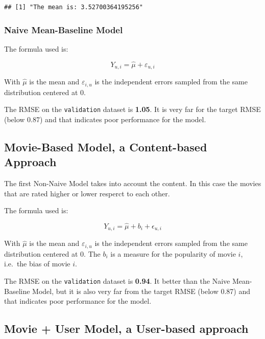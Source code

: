 \documentclass[
]{article}
\begin{document}
\begin{verbatim}
## [1] "The mean is: 3.52700364195256"
\end{verbatim}

\hypertarget{naive-mean-baseline-model}{%
\subsubsection{Naive Mean-Baseline
Model}\label{naive-mean-baseline-model}}

The formula used is:

\[Y_{u,i} = \hat{\mu} + \varepsilon_{u,i}\]

With \(\hat{\mu}\) is the mean and \(\varepsilon_{i,u}\) is the
independent errors sampled from the same distribution centered at 0.

The RMSE on the \texttt{validation} dataset is \textbf{1.05}. It is very
far for the target RMSE (below 0.87) and that indicates poor performance
for the model.

\hypertarget{movie-based-model-a-content-based-approach}{%
\subsection{Movie-Based Model, a Content-based
Approach}\label{movie-based-model-a-content-based-approach}}

The first Non-Naive Model takes into account the content. In this case
the movies that are rated higher or lower resperct to each other.

The formula used is:

\[Y_{u,i} = \hat{\mu} + b_i + \epsilon_{u,i}\]

With \(\hat{\mu}\) is the mean and \(\varepsilon_{i,u}\) is the
independent errors sampled from the same distribution centered at 0. The
\(b_i\) is a measure for the popularity of movie \(i\), i.e.~the bias of
movie \(i\).

The RMSE on the \texttt{validation} dataset is \textbf{0.94}. It better
than the Naive Mean-Baseline Model, but it is also very far from the
target RMSE (below 0.87) and that indicates poor performance for the
model.

\hypertarget{movie-user-model-a-user-based-approach}{%
\subsection{Movie + User Model, a User-based
approach}\label{movie-user-model-a-user-based-approach}}
\end{document}
